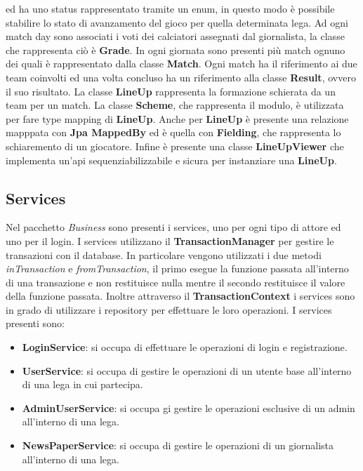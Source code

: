 ed ha uno status rappresentato tramite un enum, in questo modo è possibile stabilire lo stato di avanzamento del gioco
per quella determinata lega. Ad ogni match day sono associati i voti dei calciatori
assegnati dal giornalista, la classe che rappresenta ciò è \textbf{Grade}.
In ogni giornata sono presenti più match ognuno dei quali è rappresentato 
dalla classe \textbf{Match}. Ogni match ha il riferimento ai due team coinvolti
ed una volta concluso ha un riferimento alla classe \textbf{Result}, ovvero il suo risultato.
La classe \textbf{LineUp} rappresenta la formazione schierata da un team per un match.
La classe \textbf{Scheme}, che rappresenta il modulo, è utilizzata per fare type mapping di \textbf{LineUp}. Anche per \textbf{LineUp} è presente una relazione mapppata
con \textbf{Jpa MappedBy} ed è quella con \textbf{Fielding}, che rappresenta lo schiaremento di un giocatore.
Infine è presente una classe \textbf{LineUpViewer} che implementa un'api sequenziabilizzabile e sicura
per instanziare una \textbf{LineUp}.

\subsection{Services}
Nel pacchetto \textit{Business} sono presenti i services, uno per ogni tipo di attore ed uno per il login.
I services utilizzano il \textbf{TransactionManager} per gestire le transazioni con il database.
In particolare vengono utilizzati i due metodi \textit{inTransaction} e \textit{fromTransaction}, il primo esegue la funzione
 passata all'interno di una transazione e non restituisce nulla mentre il secondo restituisce
 il valore della funzione passata. Inoltre attraverso il \textbf{TransactionContext} i services
 sono in grado di utilizzare i repository per effettuare le loro operazioni.
 I services presenti sono:
 \begin{itemize}
    \item \textbf{LoginService}: si occupa di effettuare le operazioni di login e registrazione.
    \item \textbf{UserService}: si occupa di gestire le operazioni di un utente base all'interno di una lega in cui partecipa.
    \item \textbf{AdminUserService}: si occupa gi gestire le operazioni esclusive di un admin all'interno di una lega.
    \item \textbf{NewsPaperService}: si occupa di gestire le operazioni di un giornalista all'interno di una lega.
 \end{itemize}

